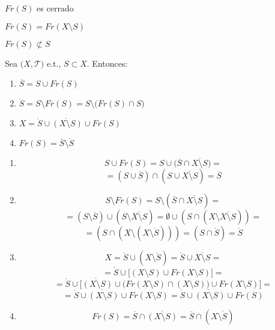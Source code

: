 \begin{obs}
  $Fr(S)$ es cerrado
\end{obs}

\begin{obs}
  $ Fr(S) = Fr(X \setminus S)$
\end{obs}

\begin{obs}
  $Fr(S)  \not\subset S$
\end{obs}

\begin{prop}
  Sea $ \big( X, \mathcal{T} \big)$ e.t., $ S \subset X$. Entonces:
  \begin{enumerate}[label=(\roman*)]
    \item $ \overline{S} = S \cup Fr(S)$
    \item $\mathring{S} = S \setminus Fr(S) = S \setminus \big(  Fr(S) \cap S \big)$
    \item $ X = \mathring{S} \cup \mathring{(X \setminus S)} \cup Fr(S)$
    \item $ Fr(S) = \overline{S} \setminus \mathring{S}$
  \end{enumerate}
\end{prop}

\begin{dem}
  \begin{enumerate}[label=(\roman*)]
    \item \[ S \cup Fr(S) =  S \cup \big( \overline{S} \cap \overline{X \setminus S} \big) = \] \[ = (S \cup \overline{S}) \cap (S \cup \overline{X \setminus S}) = \overline{S} \]
    \item \[ S \setminus Fr(S) = S \setminus (\overline{S} \cap \overline{X \setminus S}) = \]
      \[ = (S \setminus \overline{S}) \cup (S \setminus \overline{X \setminus S}) = \emptyset \cup (S \cap (X \setminus \overline{X \setminus S})) = \] 
      \[ = (S \cap (X \setminus (X \setminus \mathring{S}))) = (S \cap \mathring{S})= \mathring{S} \]
    \item \[ X = \mathring{S} \cup (X \setminus \mathring{S}) = \mathring{S} \cup \overline{X \setminus S} = \] 
      \[ = \mathring{S} \cup \big[ (X \setminus S) \cup Fr(X \setminus S) \big] =\] 
      \[ = \mathring{S} \cup \big[ \mathring{(X \setminus S)} \cup \big( Fr(X \setminus S) \cap (X \setminus S) \big) \cup Fr(X \setminus S) \big] = \]
      \[ = \mathring{S} \cup \mathring{(X \setminus S)} \cup Fr(X \setminus S) = \mathring{S} \cup \mathring{(X \setminus S)} \cup Fr(S)  \] 
    \item \[ Fr(S) = \overline{S} \cap \overline{(X \setminus S)} = \overline{S} \cap (X \setminus \mathring{S})\] 
  \end{enumerate}
\end{dem}

